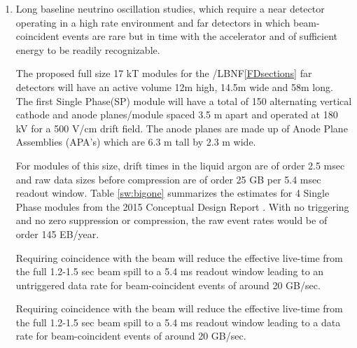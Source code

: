 \begin{enumerate}
\item Long baseline neutrino oscillation studies, which require a near detector operating in a high rate environment and far detectors in which beam-coincident events are rare but in time with the accelerator and of sufficient energy to be readily recognizable.  

The proposed  full size 17 kT modules for the  /LBNF\ref{FDsections} far detectors will  have an active volume 12m high, 14.5m wide and 58m long.  The first Single Phase(SP) module will have 
a total of 150 alternating vertical cathode and anode planes/module  spaced 3.5 m apart and operated at 180 kV for a 500 V/cm drift field.  The anode planes are made up of Anode Plane Assemblies  (APA's) which are 6.3 m tall by 2.3 m wide. %

For modules of this size, drift times in the liquid argon are of order 2.5 msec and raw data sizes before compression are of order 25 GB per 5.4 msec readout window. Table \ref{sw:bigone} summarizes the estimates for 4 Single Phase modules from the 2015 Conceptual Design Report \cite{cdr-annex-rates}.  With no triggering and no zero suppression or compression, the raw event rates would be of order 145 EB/year. 

Requiring  coincidence with the  beam will reduce the effective live-time from the full 1.2-1.5 sec beam spill to a 5.4 ms readout window leading to an untriggered data rate for beam-coincident events of around 20 GB/sec.


Requiring  coincidence with the  beam will reduce the effective live-time from the full 1.2-1.5 sec beam spill to a 5.4 ms readout window leading to a data rate for beam-coincident events of around 20 GB/sec.



\end{enumerate}
